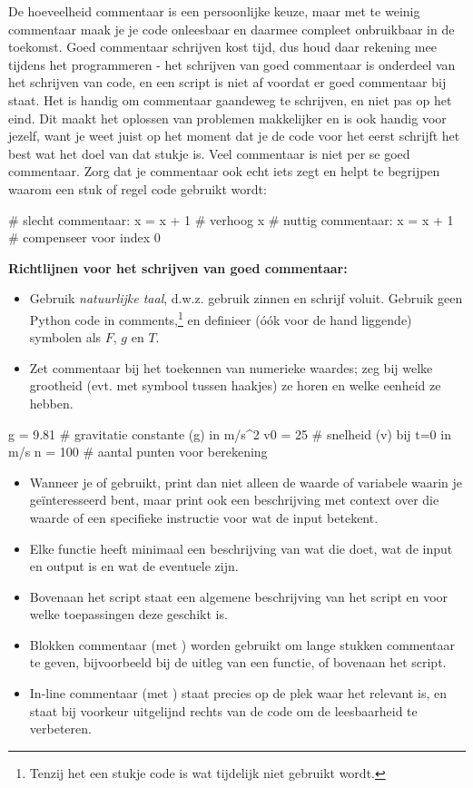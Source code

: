 \documentclass[a4paper,11pt, fleqn]{article}
\begin{document}
De hoeveelheid commentaar is een persoonlijke keuze, maar met te weinig commentaar maak je je code onleesbaar en daarmee compleet onbruikbaar in de toekomst. Goed commentaar schrijven kost tijd, dus houd daar rekening mee tijdens het programmeren - het schrijven van goed commentaar is onderdeel van het schrijven van code, en een script is niet af voordat er goed commentaar bij staat. Het is handig om commentaar gaandeweg te schrijven, en niet pas op het eind. Dit maakt het oplossen van problemen makkelijker en is ook handig voor jezelf, want je weet juist op het moment dat je de code voor het eerst schrijft het best wat het doel van dat stukje is.
Veel commentaar is niet per se goed commentaar. Zorg dat je commentaar ook echt iets zegt en helpt te begrijpen waarom een stuk of regel code gebruikt wordt:
\begin{python}
	# slecht commentaar:
	x = x + 1         # verhoog x
	# nuttig commentaar:
	x = x + 1         # compenseer voor index 0
\end{python}

\textbf{Richtlijnen voor het schrijven van goed commentaar:}
\begin{itemize}
	\item Gebruik \textit{natuurlijke taal}, d.w.z. gebruik zinnen en schrijf voluit. Gebruik geen Python code in comments,\footnote{Tenzij het een stukje code is wat tijdelijk niet gebruikt wordt.} en definieer (\'o\'ok voor de hand liggende) symbolen als $F$, $g$ en $T$.
	\item Zet commentaar bij het toekennen van numerieke waardes; zeg bij welke grootheid (evt. met symbool tussen haakjes) ze horen en welke eenheid ze hebben.
\end{itemize}

\begin{python}
	g = 9.81      # gravitatie constante (g) in m/s^2
	v0 = 25       # snelheid (v) bij t=0 in m/s
	n = 100       # aantal punten voor berekening
\end{python}

\begin{itemize}
	\item Wanneer je  of  gebruikt, print dan niet alleen de waarde of variabele waarin je ge\"interesseerd bent, maar print ook een beschrijving met context over die waarde of een specifieke instructie voor wat de input betekent.
	\item Elke functie heeft minimaal een beschrijving van wat die doet, wat de input en output is en wat de eventuele  zijn.
	\item Bovenaan het script staat een algemene beschrijving van het script en voor welke toepassingen deze geschikt is.
	\item Blokken commentaar (met ) worden gebruikt om lange stukken commentaar te geven, bijvoorbeeld bij de uitleg van een functie, of bovenaan het script.
	\item In-line commentaar (met ) staat precies op de plek waar het relevant is, en staat bij voorkeur uitgelijnd rechts van de code om de leesbaarheid te verbeteren.
\end{itemize}
\end{document}
